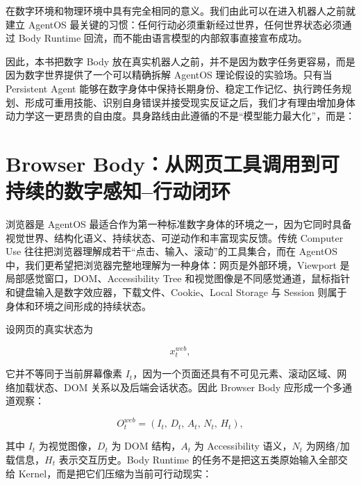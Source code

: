 \begin{statementbox}
\centering
{}
\end{statementbox}

在数字环境和物理环境中具有完全相同的意义。我们由此可以在进入机器人之前就建立 AgentOS 最关键的习惯：任何行动必须重新经过世界，任何世界状态必须通过 Body Runtime 回流，而不能由语言模型的内部叙事直接宣布成功。

因此，本书把数字 Body 放在真实机器人之前，并不是因为数字任务更容易，而是因为数字世界提供了一个可以精确拆解 AgentOS 理论假设的实验场。只有当 Persistent Agent 能够在数字身体中保持长期身份、稳定工作记忆、执行跨任务规划、形成可重用技能、识别自身错误并接受现实反证之后，我们才有理由增加身体动力学这一更昂贵的自由度。具身路线由此遵循的不是“模型能力最大化”，而是：

\begin{statementbox}
\centering
{}
\end{statementbox}

\section{Browser Body：从网页工具调用到可持续的数字感知--行动闭环}

浏览器是 AgentOS 最适合作为第一种标准数字身体的环境之一，因为它同时具备视觉世界、结构化语义、持续状态、可逆动作和丰富现实反馈。传统 Computer Use 往往把浏览器理解成若干“点击、输入、滚动”的工具集合，而在 AgentOS 中，我们更希望把浏览器完整地理解为一种身体：网页是外部环境，Viewport 是局部感觉窗口，DOM、Accessibility Tree 和视觉图像是不同感觉通道，鼠标指针和键盘输入是数字效应器，下载文件、Cookie、Local Storage 与 Session 则属于身体和环境之间形成的持续状态。

设网页的真实状态为

$$
x_t^{web},
$$

它并不等同于当前屏幕像素 $I_t$，因为一个页面还具有不可见元素、滚动区域、网络加载状态、DOM 关系以及后端会话状态。因此 Browser Body 应形成一个多通道观察：

$$
O_t^{web}
=
\left(
I_t,\,
D_t,\,
A_t,\,
N_t,\,
H_t
\right),
$$

其中 $I_t$ 为视觉图像，$D_t$ 为 DOM 结构，$A_t$ 为 Accessibility 语义，$N_t$ 为网络/加载信息，$H_t$ 表示交互历史。Body Runtime 的任务不是把这五类原始输入全部交给 Kernel，而是把它们压缩为当前可行动现实：


